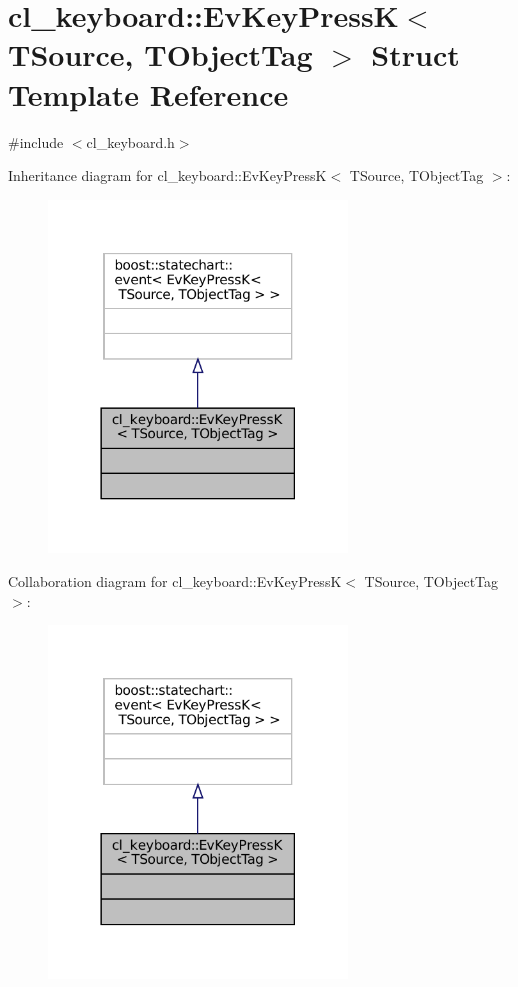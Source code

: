 \hypertarget{structcl__keyboard_1_1EvKeyPressK}{}\section{cl\+\_\+keyboard\+:\+:Ev\+Key\+PressK$<$ T\+Source, T\+Object\+Tag $>$ Struct Template Reference}
\label{structcl__keyboard_1_1EvKeyPressK}


{\ttfamily \#include $<$cl\+\_\+keyboard.\+h$>$}



Inheritance diagram for cl\+\_\+keyboard\+:\+:Ev\+Key\+PressK$<$ T\+Source, T\+Object\+Tag $>$\+:
\nopagebreak
\begin{figure}[H]
\begin{center}
\leavevmode
\includegraphics[width=225pt]{structcl__keyboard_1_1EvKeyPressK__inherit__graph}
\end{center}
\end{figure}


Collaboration diagram for cl\+\_\+keyboard\+:\+:Ev\+Key\+PressK$<$ T\+Source, T\+Object\+Tag $>$\+:
\nopagebreak
\begin{figure}[H]
\begin{center}
\leavevmode
\includegraphics[width=225pt]{structcl__keyboard_1_1EvKeyPressK__coll__graph}
\end{center}
\end{figure}



